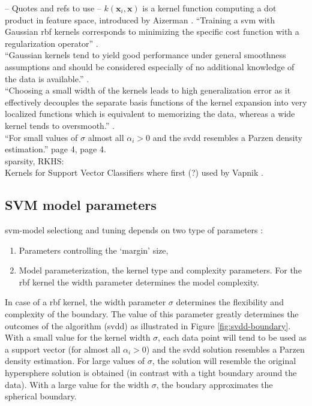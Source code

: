 -- Quotes and refs to use --
$k(\mathbf{x}_i, \mathbf{x})$ is a kernel function computing a dot product in feature space, introduced by Aizerman \etal \cite{aizerman1964theoretical}.
``Training a \gls{svm} with Gaussian \gls{rbf} kernels corresponds to minimizing the specific cost function with a regularization operator'' \cite{smola1998connection}. \\

``Gaussian kernels tend to yield good performance under general smoothness assumptions and should be considered especially of no additional knowledge of the data is available.'' \cite{smola1998connection}. \\

``Choosing a small width of the kernels leads to high generalization error as it effectively decouples the separate basis functions of the kernel expansion into very localized functions which is equivalent to memorizing the data, whereas a wide kernel tends to oversmooth.'' \cite{smola1998connection}. \\

``For small values of $\sigma$ almost all $\alpha_i >0$ and the \gls{svdd} resembles a Parzen density estimation.'' \cite{tax2002uniform} page 4, \cite{tax1999support} page 4. \\

sparsity, RKHS: \cite{girosi1998equivalence} \\

Kernels for Support Vector Classifiers where first (?) used by Vapnik \cite{vapnik1998statistical}.




\subsection{SVM model parameters}\label{subsec:svm_model_parameters}
\gls{svm}-model selectiong and tuning depends on two type of parameters \cite{cherkassky2007learning}:
\begin{enumerate}
  \item Parameters controlling the `margin' size,
  \item Model parameterization, \eg the kernel type and complexity parameters.
  For the \gls{rbf} kernel the width parameter determines the model complexity.
\end{enumerate}

In case of a \gls{rbf} kernel, the width parameter $\sigma$ determines the flexibility and complexity of the boundary.
The value of this parameter greatly determines the outcomes of the algorithm (\eg \gls{svdd}) as illustrated in Figure \ref{fig:svdd-boundary}.
With a small value for the kernel width $\sigma$, each data point will tend to be used as a support vector (for almost all $\alpha_i > 0$) and the \gls{svdd} solution resembles a Parzen density estimation.
For large values of $\sigma$, the solution will resemble the original hypersphere solution is obtained (in contrast with a tight boundary around the data).
With a large value for the width $\sigma$, the boudary approximates the spherical boundary.


